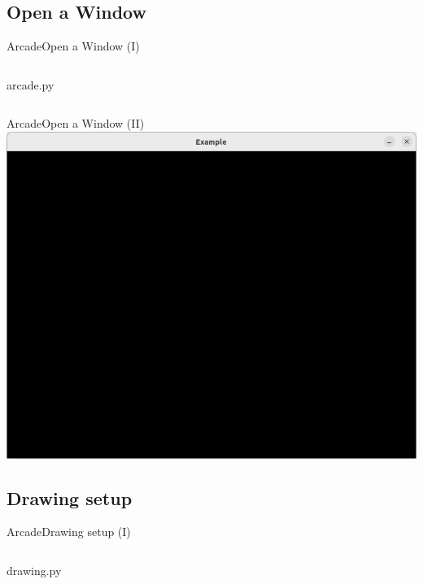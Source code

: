 \documentclass[10pt,compress]{beamer} %
\begin{document}
\subsection{Open a Window}
\begin{frame}{Arcade}{Open a Window (I)}
	\begin{columns}
		\vspace{-0.2cm}
		\begin{exampleblock}{arcade.py}
		\vspace{-0.2cm}
		
		\vspace{-0.2cm}
		\end{exampleblock}
	\end{columns}
\end{frame}

\begin{frame}{Arcade}{Open a Window (II)}
	\centering \includegraphics[width=0.5\linewidth]{figs/window.png}
\end{frame}

\subsection{Drawing setup}
\begin{frame}{Arcade}{Drawing setup (I)}
	\begin{columns}
 	   \column{0.80\textwidth}
		\vspace{-0.2cm}
		\begin{exampleblock}{drawing.py}
		\vspace{-0.2cm}
		
		\vspace{-0.2cm}
		\end{exampleblock}
	\end{columns}
\end{frame}
\end{document}
